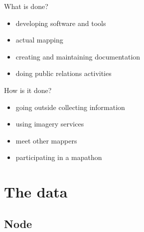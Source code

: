 \documentclass{beamer}
\begin{document}
	\begin{frame}{What is done?}
		\begin{itemize}
			\item developing software and tools
			\item actual mapping
			\item creating and maintaining documentation
			\item doing public relations activities
		\end{itemize}
	\end{frame}

	\begin{frame}{How is it done?}
		\begin{itemize}
		\item going outside collecting information
		\item using imagery services
		\item meet other mappers
		\item participating in a mapathon
		\end{itemize}
	\end{frame}

	\section{The data}
	
	\subsection{Node}
	
\end{document}
